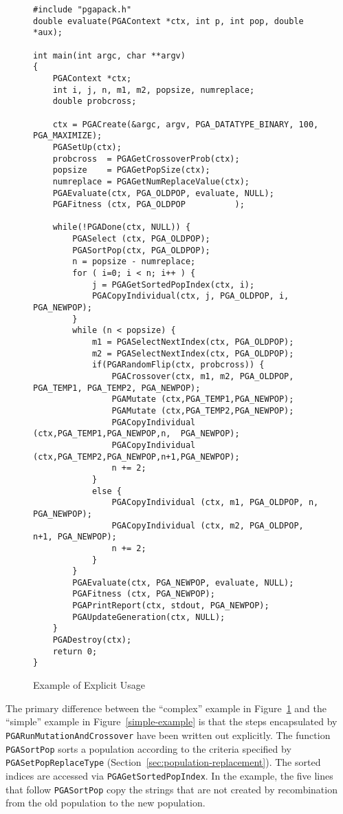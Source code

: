 \documentclass{report}
\begin{document}
\begin{figure}
\begin{verbatim}
#include "pgapack.h"
double evaluate(PGAContext *ctx, int p, int pop, double *aux);

int main(int argc, char **argv)
{
    PGAContext *ctx; 
    int i, j, n, m1, m2, popsize, numreplace;
    double probcross;

    ctx = PGACreate(&argc, argv, PGA_DATATYPE_BINARY, 100, PGA_MAXIMIZE);
    PGASetUp(ctx);
    probcross  = PGAGetCrossoverProb(ctx);
    popsize    = PGAGetPopSize(ctx);
    numreplace = PGAGetNumReplaceValue(ctx);
    PGAEvaluate(ctx, PGA_OLDPOP, evaluate, NULL);
    PGAFitness (ctx, PGA_OLDPOP          );
    
    while(!PGADone(ctx, NULL)) {
        PGASelect (ctx, PGA_OLDPOP);
        PGASortPop(ctx, PGA_OLDPOP);
        n = popsize - numreplace;
        for ( i=0; i < n; i++ ) {
            j = PGAGetSortedPopIndex(ctx, i);
            PGACopyIndividual(ctx, j, PGA_OLDPOP, i, PGA_NEWPOP);
        }
        while (n < popsize) { 
            m1 = PGASelectNextIndex(ctx, PGA_OLDPOP);
            m2 = PGASelectNextIndex(ctx, PGA_OLDPOP);        
            if(PGARandomFlip(ctx, probcross)) {
                PGACrossover(ctx, m1, m2, PGA_OLDPOP, PGA_TEMP1, PGA_TEMP2, PGA_NEWPOP);
                PGAMutate (ctx,PGA_TEMP1,PGA_NEWPOP);
                PGAMutate (ctx,PGA_TEMP2,PGA_NEWPOP);
                PGACopyIndividual (ctx,PGA_TEMP1,PGA_NEWPOP,n,  PGA_NEWPOP);
                PGACopyIndividual (ctx,PGA_TEMP2,PGA_NEWPOP,n+1,PGA_NEWPOP);
                n += 2;
            }
            else {
                PGACopyIndividual (ctx, m1, PGA_OLDPOP, n,   PGA_NEWPOP);
                PGACopyIndividual (ctx, m2, PGA_OLDPOP, n+1, PGA_NEWPOP);
                n += 2;
            }
        }
        PGAEvaluate(ctx, PGA_NEWPOP, evaluate, NULL);
        PGAFitness (ctx, PGA_NEWPOP);
        PGAPrintReport(ctx, stdout, PGA_NEWPOP);
        PGAUpdateGeneration(ctx, NULL);
    }
    PGADestroy(ctx);
    return 0;
}
\end{verbatim}
\caption{Example of Explicit Usage}
\label{complex-example}
\end{figure}

The primary difference between the ``complex'' example in
Figure~\ref{complex-example} and the ``simple'' example in
Figure~\ref{simple-example} is that the steps encapsulated by {\tt
PGARunMutationAndCrossover} have been written out explicitly.  The function
{\tt PGASortPop} sorts a population according to the criteria specified by
{\tt PGASetPopReplaceType} (Section~\ref{sec:population-replacement}).
The sorted indices are accessed via {\tt PGAGetSortedPopIndex}.  In the
example, the five lines that follow {\tt PGASortPop} copy the strings that are
not created by recombination from the old population to the new population.
\end{document}
